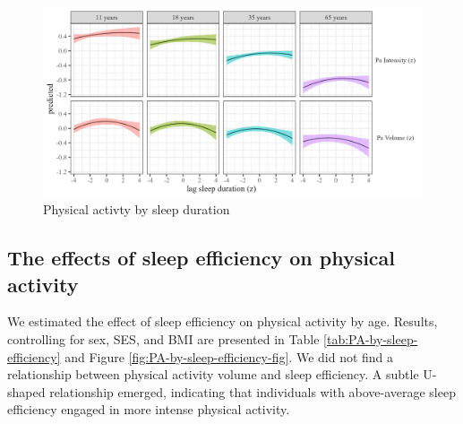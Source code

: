 \documentclass[
  man]{apa6}
\begin{document}
\begin{figure}
\includegraphics[width=7.08in]{../Figures/Pa on sleep_duration_lag} \caption{Physical activty by sleep duration}\label{fig:PA-by-sleep-duration-fig}
\end{figure}

\hypertarget{the-effects-of-sleep-efficiency-on-physical-activity}{%
\subsection{The effects of sleep efficiency on physical activity}\label{the-effects-of-sleep-efficiency-on-physical-activity}}

We estimated the effect of sleep efficiency on physical activity by age. Results, controlling for sex, SES, and BMI are presented in Table \ref{tab:PA-by-sleep-efficiency} and Figure \ref{fig:PA-by-sleep-efficiency-fig}. We did not find a relationship between physical activity volume and sleep efficiency. A subtle U-shaped relationship emerged, indicating that individuals with above-average sleep efficiency engaged in more intense physical activity.
\end{document}
